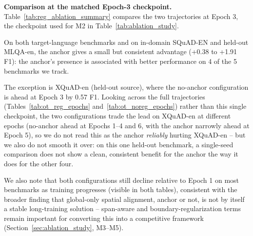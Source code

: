 \documentclass[11pt]{article}
\begin{document}
\textbf{Comparison at the matched Epoch-3 checkpoint.} Table~\ref{tab:reg_ablation_summary} compares the two trajectories at Epoch 3, the checkpoint used for M2 in Table~\ref{tab:ablation_study}.

\begin{table}[t]
\centering
\small
{}
\caption{With- vs.\ without-anchor F1 at the matched Epoch-3 checkpoint (single seed 42). Positive Diff.\ favors the anchor.}
\label{tab:reg_ablation_summary}
\end{table}

On both target-language benchmarks and on in-domain SQuAD-EN and held-out MLQA-en, the anchor gives a small but consistent advantage (+0.38 to +1.91 F1): the anchor's presence is associated with better performance on 4 of the 5 benchmarks we track.

The exception is XQuAD-en (held-out source), where the no-anchor configuration is ahead at Epoch 3 by 0.57 F1. Looking across the full trajectories (Tables~\ref{tab:ot_reg_epochs} and~\ref{tab:ot_noreg_epochs}) rather than this single checkpoint, the two configurations trade the lead on XQuAD-en at different epochs (no-anchor ahead at Epochs 1--4 and 6, with the anchor narrowly ahead at Epoch 5), so we do not read this as the anchor \emph{reliably} hurting XQuAD-en -- but we also do not smooth it over: on this one held-out benchmark, a single-seed comparison does not show a clean, consistent benefit for the anchor the way it does for the other four.

We also note that both configurations still decline relative to Epoch 1 on most benchmarks as training progresses (visible in both tables), consistent with the broader finding that global-only spatial alignment, anchor or not, is not by itself a stable long-training solution -- span-aware and boundary-regularization terms remain important for converting this into a competitive framework (Section~\ref{sec:ablation_study}, M3--M5).
\end{document}
